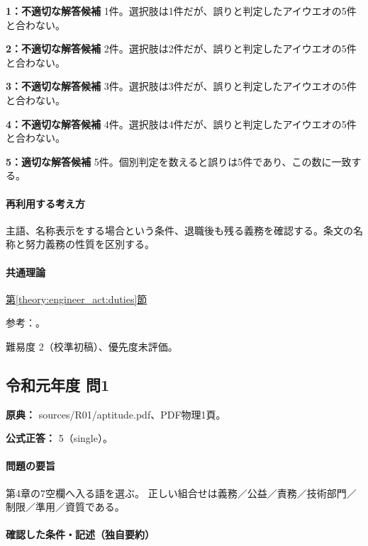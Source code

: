 \noindent\textbf{1：不適切な解答候補} 1件。選択肢は1件だが、誤りと判定したアイウエオの5件と合わない。\par

\noindent\textbf{2：不適切な解答候補} 2件。選択肢は2件だが、誤りと判定したアイウエオの5件と合わない。\par

\noindent\textbf{3：不適切な解答候補} 3件。選択肢は3件だが、誤りと判定したアイウエオの5件と合わない。\par

\noindent\textbf{4：不適切な解答候補} 4件。選択肢は4件だが、誤りと判定したアイウエオの5件と合わない。\par

\noindent\textbf{5：適切な解答候補} 5件。個別判定を数えると誤りは5件であり、この数に一致する。\par

\paragraph{再利用する考え方} 主語、名称表示をする場合という条件、退職後も残る義務を確認する。条文の名称と努力義務の性質を区別する。

\paragraph{共通理論} \hyperref[theory:engineer_act:duties]{第\ref*{theory:engineer_act:duties}節}

\par 参考：\cite{engineer_act_current}。

\par 難易度 2（校準初稿）、優先度未評価。

\subsection{令和元年度 問1}
\label{q:r01-reg-apt-01}

\noindent\textbf{原典：} sources/R01/aptitude.pdf、PDF物理1頁。

\textbf{公式正答：} 5（single）。

\paragraph{問題の要旨} 第4章の7空欄へ入る語を選ぶ。 正しい組合せは義務／公益／責務／技術部門／制限／準用／資質である。

\paragraph{確認した条件・記述（独自要約）}\mbox{}\par

